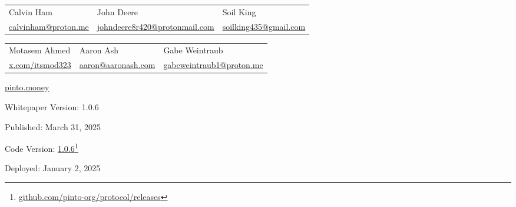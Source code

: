 \documentclass[tikz]{article}
\begin{document}
\begin{titlepage}
\begin{center}
        \vspace*{-0.52cm}

        \begin{center}
            \begin{tabular}{>{\centering\arraybackslash}p{4.6cm} >{\centering\arraybackslash}p{4.6cm} >{\centering\arraybackslash}p{4.6cm}}
                Calvin Ham & John Deere & Soil King \\
                 \href{mailto:calvinham@proton.me}{\normalsize{calvinham@proton.me}} & \href{mailto:johndeere8r420@protonmail.com}{\normalsize{johndeere8r420@protonmail.com}} & \href{mailto:soilking435@gmail.com}{\normalsize{soilking435@gmail.com}}
            \end{tabular}
        \end{center}

        \vspace*{-0.52cm}

        \begin{center}
            \begin{tabular}{>{\centering\arraybackslash}p{4.6cm} >{\centering\arraybackslash}p{4.6cm} >{\centering\arraybackslash}p{4.6cm}}
                Motasem Ahmed & Aaron Ash & Gabe Weintraub \\
                \href{https://x.com/itsmod323}{\normalsize{x.com/itsmod323}} & \href{mailto:aaron@aaronash.com}{\normalsize{aaron@aaronash.com}} & \href{mailto:gabeweintraub1@proton.me}{\normalsize{gabeweintraub1@proton.me}}
            \end{tabular}
        \end{center}


        \normalsize{\href{https://pinto.money/}{pinto.money}}

        \footnotesize{Whitepaper Version:} {\normalsize{1.0.6}}

        \vspace{-0.25cm}
        \footnotesize{Published:} {\normalsize{March 31, 2025}}

        \vspace{-0.25cm}
        \footnotesize{Code Version:} \href{https://github.com/pinto-org/protocol/releases}{\normalsize{1.0.6}}\footnote{\href{https://github.com/pinto-org/protocol/releases}{github.com/pinto-org/protocol/releases}}

        \vspace{-0.25cm}
        \footnotesize{Deployed:} {\normalsize{January 2, 2025}}
        

\end{center}
\end{titlepage}
\end{document}
